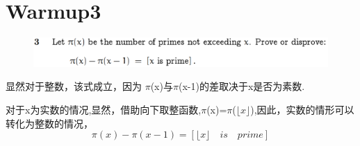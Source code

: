\documentclass[]{article}
\begin{document}
\section*{Warmup3}
\begin{figure}[H]
    \includegraphics[scale = 0.6]{2023-03-13-16-11-22.png}
\end{figure}
显然对于整数，该式成立，因为 $\pi$(x)与$\pi$(x-1)的差取决于x是否为素数.\par 
对于x为实数的情况,显然，借助向下取整函数,$\pi$(x)=$\pi$($\lfloor x\rfloor$),因此，实数的情形可以转化为整数的情况，
\begin{equation}
    \pi(x) - \pi(x-1) = [\lfloor x \rfloor \quad is \quad prime]
\end{equation}
\end{document}

